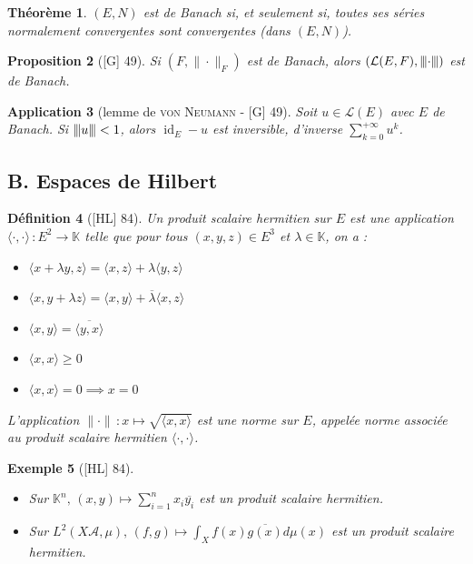 \documentclass[10pt, a4paper, parskip=full, twoside, twocolumn]{report}
\newtheorem{definition}{Définition}
\newtheorem{theorem}[definition]{Théorème}
\newtheorem{proposition}[definition]{Proposition}
\newtheorem{example}[definition]{Exemple}
\newtheorem{application}[definition]{Application}
\newcommand{\IK}{\mathbb{K}}
\newcommand{\A}{\mathscr{A}}
\DeclareMathOperator{\id}{id}
\newcommand{\vertiii}[1]{{\left\vert\kern-0.25ex\left\vert\kern-0.25ex\left\vert #1 
    \right\vert\kern-0.25ex\right\vert\kern-0.25ex\right\vert}}
\begin{document}
\begin{theorem}
	$(E,N)$ est de Banach si, et seulement si, toutes ses séries normalement convergentes sont convergentes (dans $(E,N)$).
\end{theorem}

\begin{proposition}[\textnormal{[G] 49}]
	Si $(F,\|\cdot\|_F)$ est de Banach, alors $\left(\mathcal{L}(E,F),\vertiii{\cdot}\right)$ est de Banach.
\end{proposition}

\begin{application}[lemme de \textsc{von Neumann} - \textnormal{[G] 49}]
	Soit $u\in\mathcal{L}(E)$ avec $E$ de Banach. Si $\vertiii{u}<1$, alors $\id_E-u$ est inversible, d'inverse $\sum_{k=0}^{+\infty} u^k$.
\end{application}

\subsection*{B. Espaces de Hilbert}

\begin{definition}[\textnormal{[HL] 84}]
	Un \emph{produit scalaire hermitien sur $E$} est une application $\langle\cdot,\cdot\rangle\,\colon E^2\to \IK$ telle que pour tous $(x,y,z)\in E^3$ et $\lambda\in \IK$, on a :
	\begin{itemize}
		\item $\langle x+\lambda y, z\rangle = \langle x,z\rangle + \lambda\langle y,z\rangle$
		\item $\langle x, y+ \lambda z\rangle = \langle x,y\rangle + \overline{\lambda}\langle x,z\rangle$
		\item $\langle x,y \rangle = \overline{\langle y, x\rangle}$
		\item $\langle x,x\rangle \geq 0$
		\item $\langle x,x \rangle = 0\implies x = 0$
	\end{itemize}

	L'application $\|\cdot\|\,\colon x\mapsto\sqrt{\langle x,x\rangle}$ est une norme sur $E$, appelée \emph{norme associée au produit scalaire hermitien $\langle\cdot,\cdot\rangle$.}
\end{definition}

\begin{example}[\textnormal{[HL] 84}]
	\begin{itemize}
		\item Sur $\IK^n,\, (x,y)\mapsto \sum_{i=1}^{n} x_i \overline{y_i}$ est un produit scalaire hermitien.
		\item Sur $L^2(X\A,\mu),\, (f,g)\mapsto \int_Xf(x)\overline{g(x)}d\mu(x)$ est un produit scalaire hermitien.
	\end{itemize}
\end{example}
\end{document}

